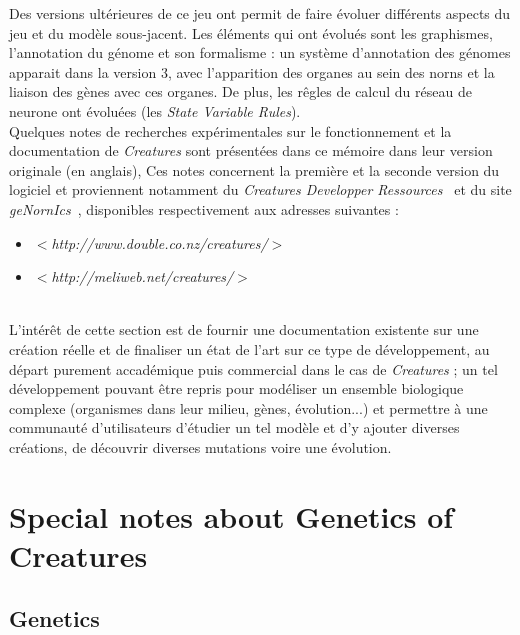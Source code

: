 \documentclass[11pt,twoside,a4paper]{article}
\begin{document}
Des versions ult{\'e}rieures de ce jeu ont permit de faire {\'e}voluer diff{\'e}rents aspects du jeu et du mod{\`e}le sous-jacent. Les {\'e}l{\'e}ments qui ont {\'e}volu{\'e}s sont les graphismes, l'annotation du g{\'e}nome et son formalisme : un syst{\`e}me d'annotation des g{\'e}nomes apparait dans la version 3, avec l'apparition des organes au sein des norns et la liaison des g{\`e}nes avec ces organes. De plus, les r{\^e}gles de calcul du r{\'e}seau de neurone ont {\'e}volu{\'e}es (les \emph{State Variable Rules}).~\\

Quelques notes de recherches exp{\'e}rimentales sur le fonctionnement et la documentation de  \textit{Creatures} sont pr{\'e}sent{\'e}es dans ce m{\'e}moire dans leur version originale (en anglais), Ces notes concernent la premi{\`e}re et la seconde version du logiciel et proviennent notamment du \emph{Creatures Developper Ressources}~\cite{CreaturesDeveloperRessources} et du site \emph{geNornIcs}~\cite{genornics}, disponibles respectivement aux adresses suivantes : 
\begin{itemize}
	\item $<$\textit{http://www.double.co.nz/creatures/}$>$
	\item $<$\textit{http://meliweb.net/creatures/}$>$
\end{itemize}~\\

L'int{\'e}r{\^e}t de cette section est de fournir une documentation existente sur une cr{\'e}ation r{\'e}elle et de finaliser un {\'e}tat de l'art sur ce type de d{\'e}veloppement, au d{\'e}part purement accad{\'e}mique puis commercial dans le cas de \emph{Creatures} ; un tel d{\'e}veloppement pouvant {\^e}tre repris pour mod{\'e}liser un ensemble biologique complexe (organismes dans leur milieu, g{\`e}nes, {\'e}volution...) et permettre {\`a} une communaut{\'e} d'utilisateurs d'{\'e}tudier un tel mod{\`e}le et d'y ajouter diverses cr{\'e}ations, de d{\'e}couvrir diverses mutations voire une {\'e}volution.~\\

\clearpage

\section{Special notes about Genetics of Creatures}

\subsection{Genetics} %
\end{document}

